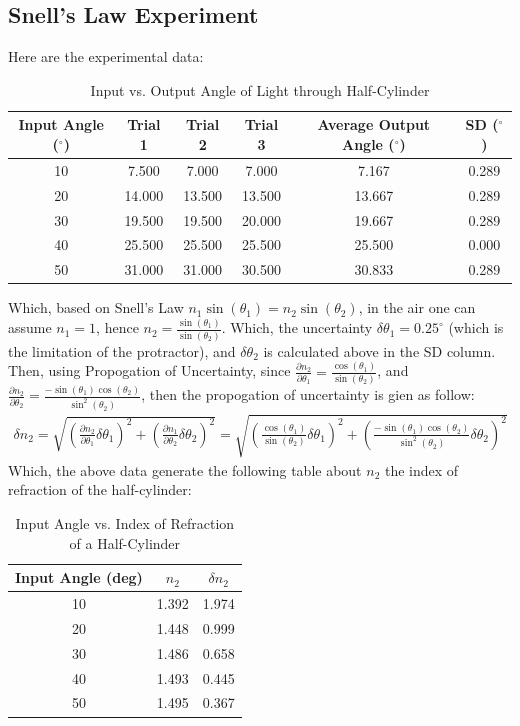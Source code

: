 \documentclass{article}
\begin{document}
\subsection{Snell's Law Experiment}
Here are the experimental data:
\begin{table}[h!]
\centering
\begin{tabular}{c||c c c|c c}
\hline
\textbf{Input Angle ($ ^\circ$)} & \textbf{Trial 1} & \textbf{Trial 2} & \textbf{Trial 3} & \textbf{Average Output Angle ($ ^\circ$)} & \textbf{SD ($ ^\circ$)} \\
\hline
10 & 7.500 & 7.000 & 7.000 & 7.167 & 0.289 \\
20 & 14.000 & 13.500 & 13.500 & 13.667 & 0.289 \\
30 & 19.500 & 19.500 & 20.000 & 19.667 & 0.289 \\
40 & 25.500 & 25.500 & 25.500 & 25.500 & 0.000 \\
50 & 31.000 & 31.000 & 30.500 & 30.833 & 0.289 \\
\hline
\end{tabular}
\caption{Input vs. Output Angle of Light through Half-Cylinder}
\label{tab:freeq_indep_data}
\end{table}
Which, based on Snell's Law $n_1\sin(\theta_1)=n_2\sin(\theta_2)$, in the air one can assume $n_1=1$, hence $n_2=\frac{\sin(\theta_1)}{\sin(\theta_2)}$. Which, the uncertainty $\delta\theta_1 = 0.25^\circ$ (which is the limitation of the protractor), and $\delta\theta_2$ is calculated above in the SD column. Then, using Propogation of Uncertainty, since $\frac{\partial n_2}{\partial \theta_1}=\frac{\cos(\theta_1)}{\sin(\theta_2)}$, and $\frac{\partial n_2}{\partial \theta_2}=\frac{-\sin(\theta_1)\cos(\theta_2)}{\sin^2(\theta_2)}$, then the propogation of uncertainty is gien as follow:
\begin{align}
    \delta n_2 = \sqrt{\left(\frac{\partial n_2}{\partial \theta_1}\delta\theta_1\right)^2+\left(\frac{\partial n_1}{\partial \theta_2}\delta \theta_2\right)^2} = \sqrt{\left(\frac{\cos(\theta_1)}{\sin(\theta_2)}\delta\theta_1\right)^2+\left(\frac{-\sin(\theta_1)\cos(\theta_2)}{\sin^2(\theta_2)}\delta \theta_2\right)^2}
\end{align}
Which, the above data generate the following table about $n_2$ the index of refraction of the half-cylinder:
\begin{table}[h!]
\centering
\begin{tabular}{c ||c |c}
\hline
\textbf{Input Angle (deg)} & \textbf{$n_2$} & \textbf{$\delta n_2$} \\
\hline
10 &  1.392 & 1.974 \\
20 &  1.448 & 0.999 \\
30 &  1.486 & 0.658 \\
40 &  1.493 & 0.445 \\
50 &  1.495 & 0.367 \\
\hline
\end{tabular}
\caption{Input Angle vs. Index of Refraction of a Half-Cylinder}
\end{table}
\end{document}
